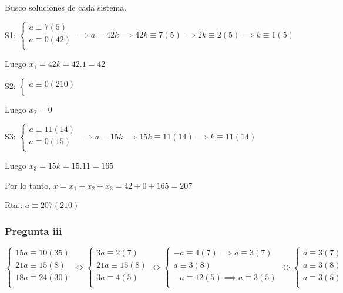 Busco soluciones de cada sistema.

S1: $ \begin{cases}
    a \equiv 7(5) \\
    a \equiv 0(42) \\
\end{cases} \implies a = 42k \implies 42k \equiv 7(5) \implies 2k \equiv 2(5) \implies k \equiv 1(5) $

Luego $ x_1 = 42k = 42.1 = 42 $

S2: $ \begin{cases}
    a \equiv 0(210) \\
\end{cases} $

Luego $ x_2 = 0 $

S3: $ \begin{cases}
    a \equiv 11(14) \\
    a \equiv 0(15) \\
\end{cases} \implies a = 15k \implies 15k \equiv 11(14) \implies k \equiv 11(14) $

Luego $ x_3 = 15k = 15.11 = 165 $

Por lo tanto, $ x = x_1 + x_2 + x_3 = 42 + 0 + 165 = 207 $

Rta.: $ a\equiv 207(210) $

\subsubsection{Pregunta iii}

$ \begin{cases}
    15a \equiv 10(35) \\
    21a \equiv 15(8) \\
    18a \equiv 24(30) \\
\end{cases} 
\iff \begin{cases}
    3a \equiv 2(7) \\
    21a \equiv 15(8) \\
    3a \equiv 4(5) \\
\end{cases}
\iff \begin{cases}
    -a \equiv 4(7) \implies a \equiv 3(7) \\
    a \equiv 3(8) \\
    -a \equiv 12(5) \implies a \equiv 3(5) \\
\end{cases}
\iff \begin{cases}
    a\equiv 3(7) \\
    a\equiv 3(8) \\
    a\equiv 3(5) \\
\end{cases} $

